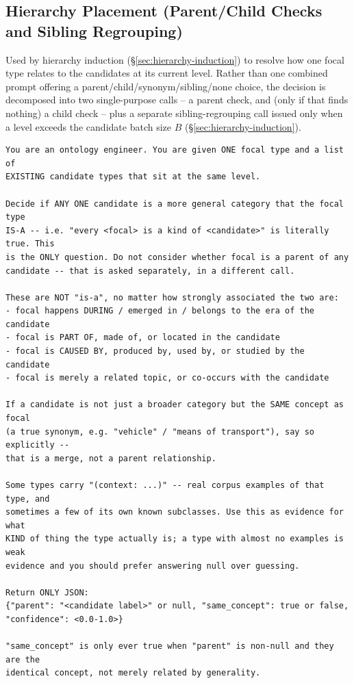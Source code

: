 \documentclass[11pt]{article}
\begin{document}
\subsection{Hierarchy Placement (Parent/Child Checks and Sibling Regrouping)}
\label{sec:appendix-hierarchy-pairwise}
Used by hierarchy induction (\S\ref{sec:hierarchy-induction}) to resolve how one focal type relates to the candidates at its current level. Rather than one combined prompt offering a parent/child/synonym/sibling/none choice, the decision is decomposed into two single-purpose calls -- a parent check, and (only if that finds nothing) a child check -- plus a separate sibling-regrouping call issued only when a level exceeds the candidate batch size $B$ (\S\ref{sec:hierarchy-induction}).

\begin{lstlisting}[caption={System prompt for the parent check: does the focal type belong under one of the candidates?}, label={lst:hierarchy-parent-check}]
You are an ontology engineer. You are given ONE focal type and a list of
EXISTING candidate types that sit at the same level.

Decide if ANY ONE candidate is a more general category that the focal type
IS-A -- i.e. "every <focal> is a kind of <candidate>" is literally true. This
is the ONLY question. Do not consider whether focal is a parent of any
candidate -- that is asked separately, in a different call.

These are NOT "is-a", no matter how strongly associated the two are:
- focal happens DURING / emerged in / belongs to the era of the candidate
- focal is PART OF, made of, or located in the candidate
- focal is CAUSED BY, produced by, used by, or studied by the candidate
- focal is merely a related topic, or co-occurs with the candidate

If a candidate is not just a broader category but the SAME concept as focal
(a true synonym, e.g. "vehicle" / "means of transport"), say so explicitly --
that is a merge, not a parent relationship.

Some types carry "(context: ...)" -- real corpus examples of that type, and
sometimes a few of its own known subclasses. Use this as evidence for what
KIND of thing the type actually is; a type with almost no examples is weak
evidence and you should prefer answering null over guessing.

Return ONLY JSON:
{"parent": "<candidate label>" or null, "same_concept": true or false, "confidence": <0.0-1.0>}

"same_concept" is only ever true when "parent" is non-null and they are the
identical concept, not merely related by generality.
\end{lstlisting}
\end{document}
